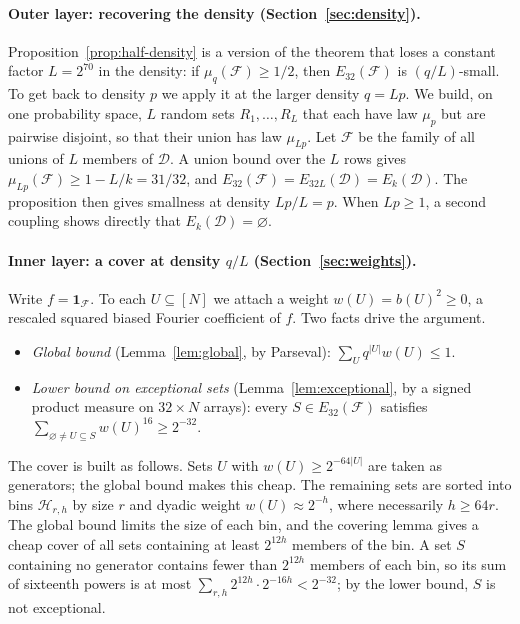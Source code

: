 \documentclass[11pt,letterpaper]{article}
\theoremstyle{definition}
\theoremstyle{remark}
\numberwithin{equation}{section}
\begin{document}
\paragraph{Outer layer: recovering the density (Section~\ref{sec:density}).}
Proposition~\ref{prop:half-density} is a version of the theorem that loses a
constant factor $L=2^{70}$ in the density: if $\mu_q(\mathcal F)\ge1/2$,
then $E_{32}(\mathcal F)$ is $(q/L)$-small. To get back to density $p$ we
apply it at the larger density $q=Lp$. We build, on one probability space,
$L$ random sets $R_1,\ldots,R_L$ that each have law $\mu_p$ but are
pairwise disjoint, so that their union has law $\mu_{Lp}$. Let $\mathcal F$
be the family of all unions of $L$ members of $\mathcal D$. A union bound
over the $L$ rows gives $\mu_{Lp}(\mathcal F)\ge1-L/k=31/32$, and
$E_{32}(\mathcal F)=E_{32L}(\mathcal D)=E_k(\mathcal D)$. The proposition
then gives smallness at density $Lp/L=p$. When $Lp\ge1$, a second coupling
shows directly that $E_k(\mathcal D)=\varnothing$.

\paragraph{Inner layer: a cover at density $q/L$ (Section~\ref{sec:weights}).}
Write $f=\mathbf 1_{\mathcal F}$. To each $U\subseteq[N]$ we attach a
weight $w(U)=b(U)^2\ge0$, a rescaled squared biased Fourier coefficient of
$f$. Two facts drive the argument.
\begin{itemize}
\item \emph{Global bound} (Lemma~\ref{lem:global}, by Parseval):
$\sum_{U}q^{|U|}w(U)\le1$.
\item \emph{Lower bound on exceptional sets} (Lemma~\ref{lem:exceptional},
by a signed product measure on $32\times N$ arrays): every
$S\in E_{32}(\mathcal F)$ satisfies
$\sum_{\varnothing\ne U\subseteq S}w(U)^{16}\ge2^{-32}$.
\end{itemize}
The cover is built as follows. Sets $U$ with $w(U)\ge2^{-64|U|}$ are taken
as generators; the global bound makes this cheap. The remaining sets are
sorted into bins $\mathcal H_{r,h}$ by size $r$ and dyadic weight
$w(U)\approx2^{-h}$, where necessarily $h\ge64r$. The global bound limits
the size of each bin, and the covering lemma gives a cheap cover of all sets
containing at least $2^{12h}$ members of the bin. A set $S$ containing no
generator contains fewer than $2^{12h}$ members of each bin, so its sum of
sixteenth powers is at most $\sum_{r,h}2^{12h}\cdot2^{-16h}<2^{-32}$; by the
lower bound, $S$ is not exceptional.
\end{document}
